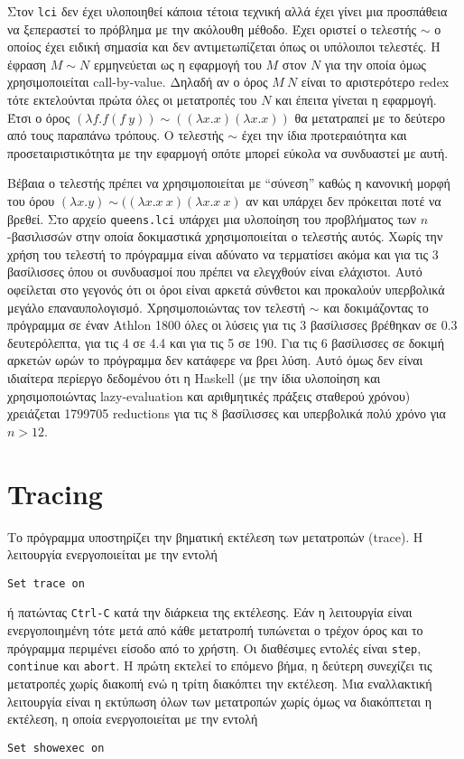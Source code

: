 \documentclass[a4paper,11pt]{article}
\newcommand{\lci}{\texttt{\en{lci}}}
\newcommand{\qm}[1]{\en{``}#1\en{''}}
\newcommand{\kwd}[1]{\en{\texttt{#1}}}
\newcommand{\en}[1]{\textlatin{#1}}
\begin{document}
Στον \lci{} δεν έχει υλοποιηθεί κάποια τέτοια τεχνική αλλά έχει γίνει μια προσπάθεια
να ξεπεραστεί το πρόβλημα με την ακόλουθη μέθοδο. Έχει οριστεί ο τελεστής $\sim$ ο
οποίος έχει ειδική σημασία και δεν αντιμετωπίζεται όπως οι υπόλοιποι τελεστές. Η
έφραση $Μ\sim N$ ερμηνεύεται ως η εφαρμογή του $Μ$ στον $Ν$ για την οποία όμως
χρησιμοποιείται \en{call-by-value}. Δηλαδή αν ο όρος $Μ\ Ν$ είναι το αριστερότερο
\en{redex} τότε εκτελούνται πρώτα όλες οι μετατροπές του $Ν$ και έπειτα γίνεται
η εφαρμογή. Έτσι ο όρος $(\lambda f.f(f\ y))\sim((\lambda x.x)(\lambda x.x))$ θα
μετατραπεί με το δεύτερο από τους παραπάνω τρόπους. Ο τελεστής $\sim$ έχει την
ίδια προτεραιότητα και προσεταιριστικότητα με την εφαρμογή οπότε μπορεί εύκολα
να συνδυαστεί με αυτή.

Βέβαια ο τελεστής πρέπει να χρησιμοποιείται με \qm{σύνεση} καθώς η κανονική μορφή
του όρου $(\lambda x.y)\sim ((\lambda x.x\ x)(\lambda x.x\ x)$ αν και υπάρχει δεν
πρόκειται ποτέ να βρεθεί. Στο αρχείο \kwd{queens.lci} υπάρχει μια υλοποίηση του
προβλήματος των $n$-βασιλισσών στην οποία δοκιμαστικά χρησιμοποιείται ο τελεστής
αυτός. Χωρίς την χρήση του τελεστή το πρόγραμμα είναι αδύνατο να τερματίσει 
ακόμα και για τις 3 βασίλισσες όπου οι συνδυασμοί που πρέπει να ελεγχθούν είναι ελάχιστοι.
Αυτό οφείλεται στο γεγονός ότι οι όροι είναι αρκετά σύνθετοι και προκαλούν υπερβολικά
μεγάλο επαναυπολογισμό.
Χρησιμοποιώντας τον τελεστή $\sim$ και δοκιμάζοντας το πρόγραμμα σε έναν \en{Athlon 1800}
όλες οι λύσεις για τις 3 βασίλισσες βρέθηκαν σε 0.3 δευτερόλεπτα, για τις 4 σε 4.4 και
για τις 5 σε 190. Για τις 6 βασίλισσες σε δοκιμή αρκετών ωρών το πρόγραμμα δεν κατάφερε
να βρει λύση. Αυτό όμως δεν είναι ιδιαίτερα περίεργο δεδομένου ότι η \en{Haskell}
(με την ίδια υλοποίηση και χρησιμοποιώντας \en{lazy-evaluation} και αριθμητικές πράξεις
σταθερού χρόνου) χρειάζεται 1799705 \en{reductions} για τις 8 βασίλισσες και
υπερβολικά πολύ χρόνο για $n>12$.

\section{\en{Tracing}}
Το πρόγραμμα υποστηρίζει την βηματική εκτέλεση των μετατροπών (\en{trace}). Η λειτουργία
ενεργοποιείται με την εντολή
\begin{center}
	\kwd{Set trace on}
\end{center}
ή πατώντας \kwd{Ctrl-C} κατά την διάρκεια της εκτέλεσης. Εάν η λειτουργία είναι
ενεργοποιημένη τότε μετά από κάθε μετατροπή τυπώνεται ο τρέχον όρος και το
πρόγραμμα περιμένει είσοδο από το χρήστη. Οι διαθέσιμες εντολές είναι \kwd{step},
\kwd{continue} και \kwd{abort}. Η πρώτη εκτελεί το επόμενο βήμα, η
δεύτερη συνεχίζει τις μετατροπές χωρίς διακοπή ενώ η τρίτη διακόπτει την εκτέλεση.
Μια εναλλακτική λειτουργία είναι η εκτύπωση όλων των μετατροπών χωρίς όμως να
διακόπτεται η εκτέλεση, η οποία ενεργοποιείται με την εντολή
\begin{center}
	\kwd{Set showexec on}
\end{center}
\end{document}
